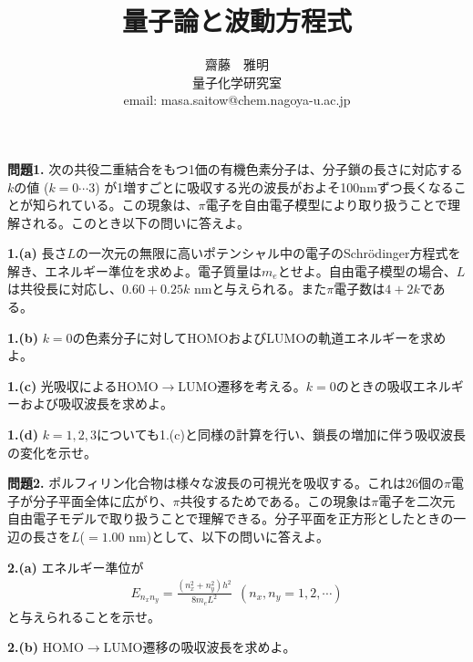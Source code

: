 \documentclass[12pt,pra,aps]{revtex4}
\begin{document}
\title{量子論と波動方程式}
\author{齋藤　雅明 \\ 量子化学研究室 \\ email: masa.saitow@chem.nagoya-u.ac.jp}

\maketitle

\noindent
{\bf 問題1.} 次の共役二重結合をもつ1価の有機色素分子は、分子鎖の長さに対応する$k$の値 ($k=0\cdots 3$) が1増すごとに吸収する光の波長がおよそ100nmずつ長くなることが知られている。この現象は、$\pi$電子を自由電子模型により取り扱うことで理解される。このとき以下の問いに答えよ。

\noindent
{\bf 1.(a)} 長さ$L$の一次元の無限に高いポテンシャル中の電子のSchr\"odinger方程式を解き、エネルギー準位を求めよ。電子質量は$m_e$とせよ。自由電子模型の場合、$L$は共役長に対応し、$0.60+0.25k$ nmと与えられる。また$\pi$電子数は$4+2k$である。

\noindent
{\bf 1.(b)} $k=0$の色素分子に対してHOMOおよびLUMOの軌道エネルギーを求めよ。

\noindent
{\bf 1.(c)} 光吸収によるHOMO$\rightarrow$LUMO遷移を考える。$k=0$のときの吸収エネルギーおよび吸収波長を求めよ。

\noindent
{\bf 1.(d)} $k=1,2,3$についても1.(c)と同様の計算を行い、鎖長の増加に伴う吸収波長の変化を示せ。
    
\noindent
{\bf 問題2.} ポルフィリン化合物は様々な波長の可視光を吸収する。これは26個の$\pi$電子が分子平面全体に広がり、$\pi$共役するためである。この現象は$\pi$電子を二次元自由電子モデルで取り扱うことで理解できる。分子平面を正方形としたときの一辺の長さを$L$($=1.00$ nm)として、以下の問いに答えよ。

\noindent
{\bf 2.(a)} エネルギー準位が
\begin{align}
  E_{n_x n_y} = \frac{(n_x^2+n_y^2)h^2}{8m_eL^2}\ \ (n_x,n_y=1,2,\cdots)
\end{align}
と与えられることを示せ。

\noindent
{\bf 2.(b)} HOMO$\rightarrow$LUMO遷移の吸収波長を求めよ。

    
\end{document}
